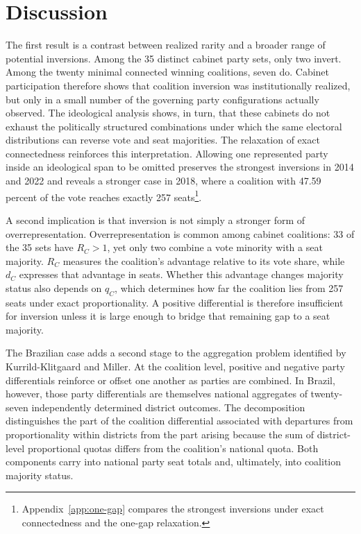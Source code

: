 \documentclass[11pt]{article}
\begin{document}
\section{Discussion}


The first result is a contrast between realized rarity and a broader range of
potential inversions. Among the 35 distinct cabinet party sets, only two invert.
Among the twenty minimal connected winning coalitions, seven do. Cabinet
participation therefore shows that coalition inversion was institutionally
realized, but only in a small number of the governing party configurations
actually observed. The ideological analysis shows, in turn, that these cabinets
do not exhaust the politically structured combinations under which the same
electoral distributions can reverse vote and seat majorities. The relaxation of
exact connectedness reinforces this interpretation. Allowing one represented
party inside an ideological span to be omitted preserves the strongest
inversions in 2014 and 2022 and reveals a stronger case in 2018, where a
coalition with 47.59 percent of the vote reaches exactly 257 seats\footnote{
Appendix~\ref{app:one-gap} compares the strongest inversions
under exact connectedness and the one-gap relaxation.}.


A second implication is that inversion is not simply a stronger form of
overrepresentation. Overrepresentation is common among cabinet coalitions: 33 of
the 35 sets have \(R_C>1\), yet only two combine a vote minority with a seat
majority. \(R_C\) measures the coalition's advantage relative to its vote share,
while \(d_C\) expresses that advantage in seats. Whether this advantage changes
majority status also depends on \(q_C\), which determines how far the coalition
lies from 257 seats under exact proportionality. A positive differential is
therefore insufficient for inversion unless it is large enough to bridge that
remaining gap to a seat majority. 



The Brazilian case adds a second stage to the aggregation problem identified
by Kurrild-Klitgaard and Miller. At the coalition level, positive and negative
party differentials reinforce or offset one another as parties are combined.
In Brazil, however, those party differentials are themselves national
aggregates of twenty-seven independently determined district outcomes. The
decomposition distinguishes the part of the coalition differential associated
with departures from proportionality within districts from the part arising
because the sum of district-level proportional quotas differs from the
coalition's national quota.  Both components carry into national party seat totals and, ultimately, into
coalition majority status.
\end{document}
